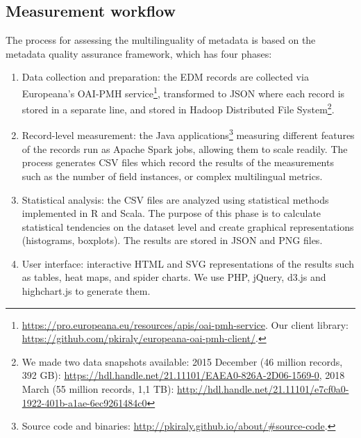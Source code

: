 \subsection{Measurement workflow}
The process for assessing the multilinguality of metadata is based on the metadata quality assurance framework, which has four phases:
\begin{enumerate}
\item Data collection and preparation: the {EDM} records are collected via Europeana's OAI-PMH service\footnote{ \url{https://pro.europeana.eu/resources/apis/oai-pmh-service}. Our client library: \url{https://github.com/pkiraly/europeana-oai-pmh-client/}.}, transformed to JSON where each record is stored in a separate line, and stored in Hadoop Distributed File System\footnote{ We made two data snapshots available: 2015 December (46 million records, 392 GB): \url{https://hdl.handle.net/21.11101/EAEA0-826A-2D06-1569-0}, 2018 March (55 million records, 1,1 TB): \url{http://hdl.handle.net/21.11101/e7cf0a0-1922-401b-a1ae-6ec9261484c0}}.
\item Record-level measurement: the Java applications\footnote{ Source code and binaries: \url{ http://pkiraly.github.io/about/\#source-code}.} measuring different features of the records run as Apache Spark jobs, allowing them to scale readily. The process generates CSV files which record the results of the measurements such as the number of field instances, or complex multilingual metrics.
\item Statistical analysis: the CSV files are analyzed using statistical methods implemented in R and Scala. The purpose of this phase is to calculate statistical tendencies on the dataset level and create graphical representations (histograms, boxplots). The results are stored in JSON and PNG files. 
\item User interface: interactive HTML and SVG representations of the results such as tables, heat maps, and spider charts. We use PHP, jQuery, d3.js and highchart.js to generate them.
\end{enumerate} 






